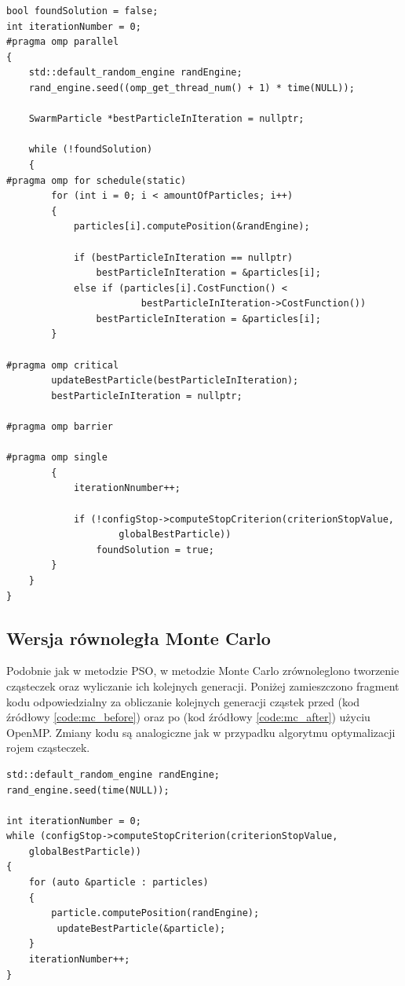 \documentclass[11pt, a4paper, oneside]{article}
\begin{document}
\begin{lstlisting}[style=mycpp, label=code:pso_after, caption={Optymalizacja PSO - kod równoległy.}]
bool foundSolution = false;
int iterationNumber = 0;
#pragma omp parallel
{
    std::default_random_engine randEngine;
    rand_engine.seed((omp_get_thread_num() + 1) * time(NULL));

    SwarmParticle *bestParticleInIteration = nullptr;

    while (!foundSolution)
    {
#pragma omp for schedule(static)
        for (int i = 0; i < amountOfParticles; i++)
        {
            particles[i].computePosition(&randEngine);

            if (bestParticleInIteration == nullptr)
                bestParticleInIteration = &particles[i];
            else if (particles[i].CostFunction() <
                        bestParticleInIteration->CostFunction())
                bestParticleInIteration = &particles[i];
        }

#pragma omp critical
        updateBestParticle(bestParticleInIteration);
        bestParticleInIteration = nullptr;

#pragma omp barrier

#pragma omp single
        {
            iterationNnumber++;

            if (!configStop->computeStopCriterion(criterionStopValue,
                    globalBestParticle))
                foundSolution = true;
        }
    }
}
\end{lstlisting}

\subsection{Wersja równoległa Monte Carlo}

Podobnie jak w metodzie PSO, w metodzie Monte Carlo zrównoleglono tworzenie cząsteczek oraz wyliczanie ich kolejnych generacji. Poniżej zamieszczono fragment kodu odpowiedzialny za obliczanie kolejnych generacji cząstek przed (kod źródłowy \ref{code:mc_before}) oraz po (kod źródłowy \ref{code:mc_after}) użyciu OpenMP. Zmiany kodu są analogiczne jak w przypadku algorytmu optymalizacji rojem cząsteczek.

\begin{lstlisting}[style=mycpp, label=code:mc_before, caption={Optymalizacja Monte Carlo - kod sekwencyjny.}]
std::default_random_engine randEngine;
rand_engine.seed(time(NULL));

int iterationNumber = 0;
while (configStop->computeStopCriterion(criterionStopValue,
    globalBestParticle))
{
    for (auto &particle : particles)
    {
        particle.computePosition(randEngine);
         updateBestParticle(&particle);
    }
    iterationNumber++;
}
\end{lstlisting}
\end{document}
